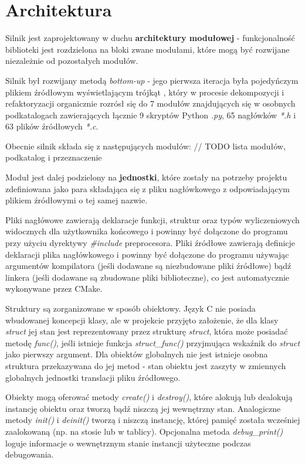 \section{Architektura}

Silnik jest zaprojektowany w duchu \textbf{architektury modułowej} - funkcjonalność biblioteki jest rozdzielona na bloki zwane modułami, które mogą być rozwijane niezależnie od pozostałych modułów.

Silnik był rozwijany metodą \textit{bottom-up} - jego pierwsza iteracja była pojedyńczym plikiem źródłowym wyświetlającym trójkąt \cite{VULKANTUTORIAL}, który w procesie dekompozycji i refaktoryzacji organicznie rozrósł się do 7 modułów znajdujących się w osobnych podkatalogach zawierających łącznie 9 skryptów Python \textit{.py}, 65 nagłówków \textit{*.h} i 63 plików źródłowych \textit{*.c}.

Obecnie silnik składa się z następujących modułów:
// TODO lista modułów, podkatalog i przeznaczenie

Moduł jest dalej podzielony na \textbf{jednostki}, które zostały na potrzeby projektu zdefiniowana jako para składająca się z pliku nagłówkowego z odpowiadającym plikiem źródłowymi o tej samej nazwie.

Pliki nagłówowe zawierają deklaracje funkcji, struktur oraz typów wyliczeniowych widocznych dla użytkownika końcowego i powinny być dołączone do programu przy użyciu dyrektywy \textit{\#include} preprocesora.
Pliki źródłowe zawierają definicje deklaracji plika nagłówkowego i powinny być dołączone do programu używając argumentów kompilatora (jeśli dodawane są niezbudowane pliki źródłowe) bądź linkera (jeśli dodawane są zbudowane pliki biblioteczne), co jest automatycznie wykonywane przez CMake.

Struktury są zorganizowane w sposób obiektowy.
Język C nie posiada wbudowanej koncepcji klasy, ale w projekcie przyjęto założenie, że dla klasy \textit{struct} jej stan jest reprezentowany przez strukturę \textit{struct}, która może posiadać metodę \textit{func()}, jeśli istnieje funkcja \textit{struct\_func()} przyjmująca wskaźnik do \textit{struct} jako pierwszy argument.
Dla obiektów globalnych nie jest istnieje osobna struktura przekazywana do jej metod - stan obiektu jest zaszyty w zmiennych globalnych jednostki translacji pliku źródłowego.

Obiekty mogą oferować metody \textit{create()} i \textit{destroy()}, które alokują lub dealokują instancję obiektu oraz tworzą bądź niszczą jej wewnętrzny stan.
Analogiczne metody \textit{init()} i \textit{deinit()} tworzą i niszczą instancję, której pamięć została wcześniej zaalokowaną (np. na stosie lub w tablicy).
Opcjonalna metoda \textit{debug\_print()} loguje informacje o wewnętrznym stanie instancji użyteczne podczas debugowania.

